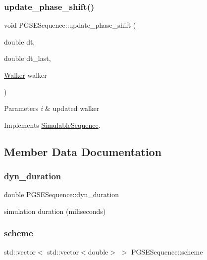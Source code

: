 \subsubsection{\texorpdfstring{update\+\_\+phase\+\_\+shift()}{update\_phase\_shift()}}
{\footnotesize\ttfamily void P\+G\+S\+E\+Sequence\+::update\+\_\+phase\+\_\+shift (\begin{DoxyParamCaption}\item[{double}]{dt,  }\item[{double}]{dt\+\_\+last,  }\item[{\hyperlink{class_walker}{Walker}}]{walker }\end{DoxyParamCaption})\hspace{0.3cm}{\ttfamily [virtual]}}


\begin{DoxyParams}{Parameters}
{\em i} & updated walker \\
\hline
\end{DoxyParams}


Implements \hyperlink{class_simulable_sequence_ad7b2a30f563343aa65489aa553d4df63}{Simulable\+Sequence}.



\subsection{Member Data Documentation}
\mbox{\label{class_p_g_s_e_sequence_a0c7e884c3b71cbcc04d6cb2d5f2a5eb9}} 
\subsubsection{\texorpdfstring{dyn\+\_\+duration}{dyn\_duration}}
{\footnotesize\ttfamily double P\+G\+S\+E\+Sequence\+::dyn\+\_\+duration}

simulation duration (miliseconds) \mbox{\label{class_p_g_s_e_sequence_a7349d86720a34e75eaf578fdfd3caeeb}} 
\subsubsection{\texorpdfstring{scheme}{scheme}}
{\footnotesize\ttfamily std\+::vector$<$ std\+::vector$<$double$>$ $>$ P\+G\+S\+E\+Sequence\+::scheme}

